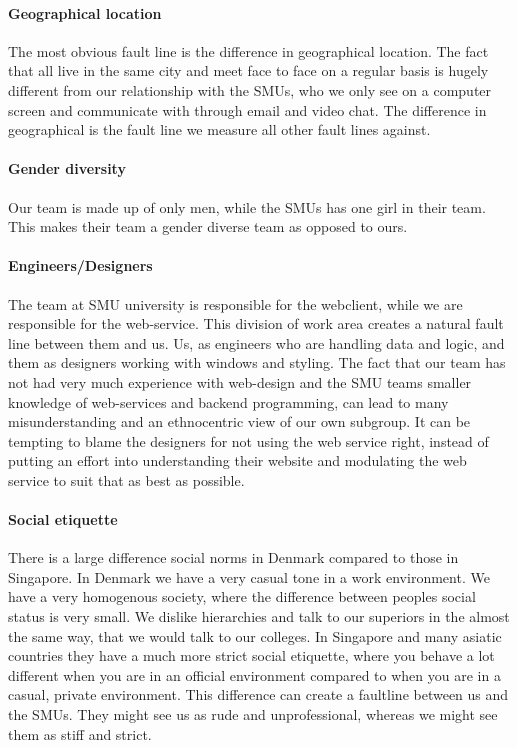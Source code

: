 \documentclass[a4paper,11pt,report]{article}
\begin{document}
{\paragraph{Geographical location}
The most obvious fault line is the difference in geographical location. The fact that all live in the same city and meet face to face on a regular basis is hugely different from our relationship with the SMUs, who we only see on a computer screen and communicate with through email and video chat. The difference in geographical is the fault line we measure all other fault lines against.

\paragraph{Gender diversity}
Our team is made up of only men, while the SMUs has one girl in their team. This makes their team a gender diverse team as opposed to ours.

\paragraph{Engineers/Designers}
The team at SMU university is responsible for the webclient, while we are responsible for the web-service. This division of work area creates a natural fault line between them and us. Us, as engineers who are handling data and logic, and them as designers working with windows and styling. The fact that our team has not had very much experience with web-design and the SMU teams smaller knowledge of web-services and backend programming, can lead to many misunderstanding and an ethnocentric view of our own subgroup. It can be tempting to blame the designers for not using the web service right, instead of putting an effort into understanding their website and modulating the web service to suit that as best as possible.

\paragraph{Social etiquette}
There is a large difference social norms in Denmark compared to those in Singapore. In Denmark we have a very casual tone in a work environment. We have a very homogenous society, where the difference between peoples social status is very small. We dislike hierarchies and talk to our superiors in the almost the same way, that we would talk to our colleges. In Singapore and many asiatic countries they have a much more strict social etiquette, where you behave a lot different when you are in an official environment compared to when you are in a casual, private environment. This difference can create a faultline between us and the SMUs. They might see us as rude and unprofessional, whereas we might see them as stiff and strict. 

}
\end{document}
